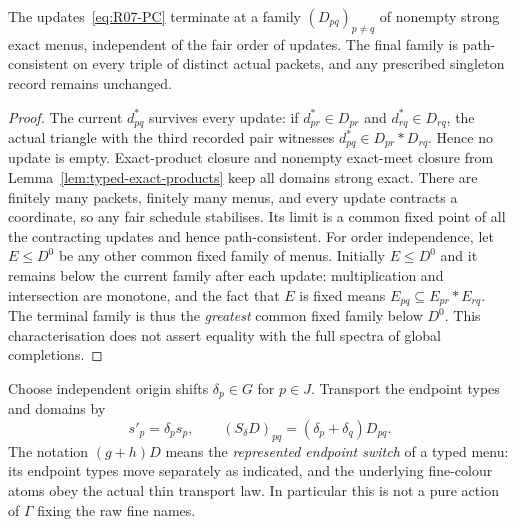 \begin{lemma}
\label{lem:R07-PC}
The updates~\eqref{eq:R07-PC} terminate at a family
$(D_{pq})_{p\ne q}$ of nonempty strong exact menus, independent
of the fair order of updates.  The final family is
path-consistent on every triple of distinct actual packets,
and any prescribed singleton record remains unchanged.
\end{lemma}
\begin{proof}
The current $d^*_{pq}$ survives every update: if
$d^*_{pr}\in D_{pr}$ and $d^*_{rq}\in D_{rq}$, the actual
triangle with the third recorded pair witnesses
$d^*_{pq}\in D_{pr}*D_{rq}$.  Hence no update is empty.
Exact-product closure and nonempty exact-meet closure from
Lemma~\ref{lem:typed-exact-products} keep all domains strong
exact.  There are finitely many packets, finitely many menus,
and every update contracts a coordinate, so any fair schedule
stabilises.  Its limit is a common fixed point of all the
contracting updates and hence path-consistent.
For order independence, let $E\le D^0$ be any other common
fixed family of menus.  Initially $E\le D^0$ and it remains
below the current family after each update: multiplication
and intersection are monotone, and the fact that $E$ is fixed
means $E_{pq}\subseteq E_{pr}*E_{rq}$.  The terminal family
is thus the \emph{greatest} common fixed family below $D^0$.
This characterisation does not assert equality with the full
spectra of global completions.
\end{proof}

Choose independent origin shifts $\delta_p\in G$ for $p\in J$.
Transport the endpoint types and domains by
\begin{equation}\label{eq:R07-gauge}
 s'_p=\delta_p s_p,\qquad
 (S_\delta D)_{pq}=(\delta_p+\delta_q)D_{pq}.
\end{equation}
The notation $(g+h)D$ means the \emph{represented endpoint
switch} of a typed menu: its endpoint types move separately as
indicated, and the underlying fine-colour atoms obey the actual
thin transport law.  In particular this is not a pure action
of $\Gamma$ fixing the raw fine names.

